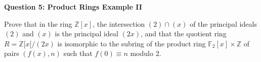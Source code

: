 \documentclass[11pt,twoside, a4paper]{report}
\theoremstyle{plain}
\theoremstyle{definition}
\begin{document}
\begin{center}
{\bf Question 5: Product Rings Example II}
\end{center}

Prove that in the ring $\mathbb{Z}[x]$, the intersection $(2) \cap (x)$ of the principal ideals $(2)$ and $(x)$ is the principal ideal $(2x)$, and that the quotient ring $R = \mathbb{Z}[x[/(2x)$ is isomorphic to the subring of the product ring $\mathbb{F}_2[x] \times \mathbb{Z}$ of pairs $(f(x), n)$ such that $f(0) \equiv n$ modulo 2.







\end{document}

